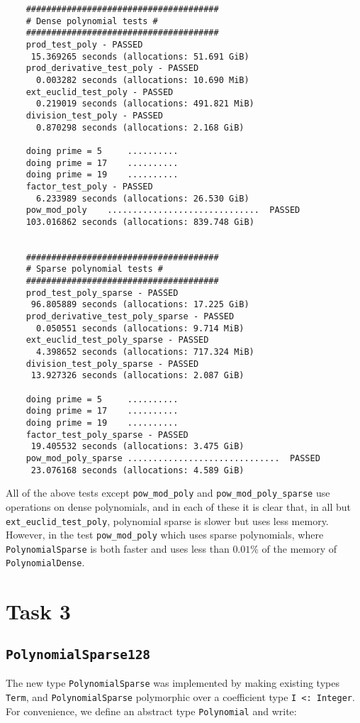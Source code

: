 \documentclass{article}
\theoremstyle{plain}
\numberwithin{theorem}{section}
\numberwithin{example}{section}
\theoremstyle{definition}
\numberwithin{definition}{section}
\begin{document}
\begin{Verbatim}
    ######################################
    # Dense polynomial tests #
    ######################################
    prod_test_poly - PASSED
     15.369265 seconds (allocations: 51.691 GiB)
    prod_derivative_test_poly - PASSED
      0.003282 seconds (allocations: 10.690 MiB)
    ext_euclid_test_poly - PASSED
      0.219019 seconds (allocations: 491.821 MiB)
    division_test_poly - PASSED
      0.870298 seconds (allocations: 2.168 GiB)

    doing prime = 5 	..........
    doing prime = 17 	..........
    doing prime = 19 	..........
    factor_test_poly - PASSED
      6.233989 seconds (allocations: 26.530 GiB)
    pow_mod_poly	..............................	PASSED
    103.016862 seconds (allocations: 839.748 GiB)


    ######################################
    # Sparse polynomial tests #
    ######################################
    prod_test_poly_sparse - PASSED
     96.805889 seconds (allocations: 17.225 GiB)
    prod_derivative_test_poly_sparse - PASSED
      0.050551 seconds (allocations: 9.714 MiB)
    ext_euclid_test_poly_sparse - PASSED
      4.398652 seconds (allocations: 717.324 MiB)
    division_test_poly_sparse - PASSED
     13.927326 seconds (allocations: 2.087 GiB)

    doing prime = 5 	..........
    doing prime = 17 	..........
    doing prime = 19 	..........
    factor_test_poly_sparse - PASSED
     19.405532 seconds (allocations: 3.475 GiB)
    pow_mod_poly_sparse	..............................	PASSED
     23.076168 seconds (allocations: 4.589 GiB)
\end{Verbatim}

All of the above tests except \texttt{pow\_mod\_poly} and
\texttt{pow\_mod\_poly\_sparse} use operations on dense polynomials, and in
each of these it is clear that, in all but \texttt{ext\_euclid\_test\_poly},
polynomial sparse is slower but uses less memory. However, in the test
\texttt{pow\_mod\_poly} which uses sparse polynomials, where
\texttt{PolynomialSparse} is both faster and uses less than $0.01\%$ of the
memory of \texttt{PolynomialDense}.

\bigbreak

\section{Task 3}
\subsection{\texttt{PolynomialSparse128}}
The new type \texttt{PolynomialSparse} was implemented by making existing types
\texttt{Term}, and \texttt{PolynomialSparse} polymorphic over a coefficient type
\texttt{I <: Integer}. For convenience, we define an abstract type
\texttt{Polynomial} and write:
\end{document}
